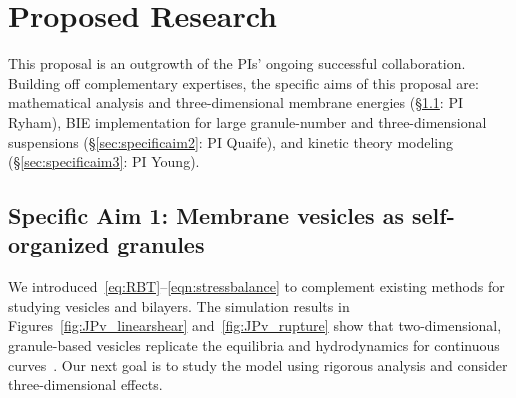 \section{Proposed Research}
\label{sec:proposed-work}
This proposal is an outgrowth of the PIs' ongoing successful
collaboration. Building off complementary expertises, the specific aims
of this proposal are: mathematical analysis and three-dimensional
membrane energies (\S\ref{sec:specificaim1}: PI Ryham), BIE
implementation for large granule-number and three-dimensional
suspensions (\S\ref{sec:specificaim2}: PI Quaife), and kinetic theory modeling
(\S\ref{sec:specificaim3}: PI Young).

\subsection{Specific Aim 1: Membrane vesicles as self-organized granules}
\label{sec:specificaim1}
We introduced~\eqref{eq:RBT}--\eqref{eqn:stressbalance} to complement
existing methods for studying vesicles and bilayers. The simulation
results in Figures~\ref{fig:JPv_linearshear} and~\ref{fig:JPv_rupture}
show that two-dimensional, granule-based vesicles replicate the
equilibria and hydrodynamics for continuous curves~\cite{FuQuRyYo22,
Fu2018_SIAM}. Our next goal is to study the model using rigorous
analysis and consider three-dimensional effects. 

